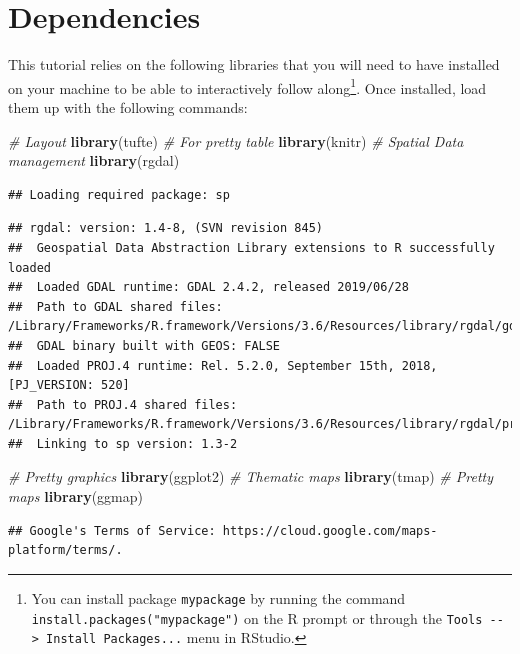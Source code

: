 \documentclass[]{book}
\newenvironment{Shaded}{\begin{snugshade}}{\end{snugshade}}
\newcommand{\KeywordTok}[1]{\textcolor[rgb]{0.13,0.29,0.53}{\textbf{#1}}}
\newcommand{\CommentTok}[1]{\textcolor[rgb]{0.56,0.35,0.01}{\textit{#1}}}
\newcommand{\NormalTok}[1]{#1}
\begin{document}
\section{Dependencies}\label{dependencies-1}

This tutorial relies on the following libraries that you will need to
have installed on your machine to be able to interactively follow
along\footnote{You can install package \texttt{mypackage} by running the
  command \texttt{install.packages("mypackage")} on the R prompt or
  through the \texttt{Tools\ -\/-\textgreater{}\ Install\ Packages...}
  menu in RStudio.}. Once installed, load them up with the following
commands:

\begin{Shaded}
\begin{Highlighting}[]
\CommentTok{# Layout}
\KeywordTok{library}\NormalTok{(tufte)}
\CommentTok{# For pretty table}
\KeywordTok{library}\NormalTok{(knitr)}
\CommentTok{# Spatial Data management}
\KeywordTok{library}\NormalTok{(rgdal)}
\end{Highlighting}
\end{Shaded}

\begin{verbatim}
## Loading required package: sp
\end{verbatim}

\begin{verbatim}
## rgdal: version: 1.4-8, (SVN revision 845)
##  Geospatial Data Abstraction Library extensions to R successfully loaded
##  Loaded GDAL runtime: GDAL 2.4.2, released 2019/06/28
##  Path to GDAL shared files: /Library/Frameworks/R.framework/Versions/3.6/Resources/library/rgdal/gdal
##  GDAL binary built with GEOS: FALSE 
##  Loaded PROJ.4 runtime: Rel. 5.2.0, September 15th, 2018, [PJ_VERSION: 520]
##  Path to PROJ.4 shared files: /Library/Frameworks/R.framework/Versions/3.6/Resources/library/rgdal/proj
##  Linking to sp version: 1.3-2
\end{verbatim}

\begin{Shaded}
\begin{Highlighting}[]
\CommentTok{# Pretty graphics}
\KeywordTok{library}\NormalTok{(ggplot2)}
\CommentTok{# Thematic maps}
\KeywordTok{library}\NormalTok{(tmap)}
\CommentTok{# Pretty maps}
\KeywordTok{library}\NormalTok{(ggmap)}
\end{Highlighting}
\end{Shaded}

\begin{verbatim}
## Google's Terms of Service: https://cloud.google.com/maps-platform/terms/.
\end{verbatim}
\end{document}
